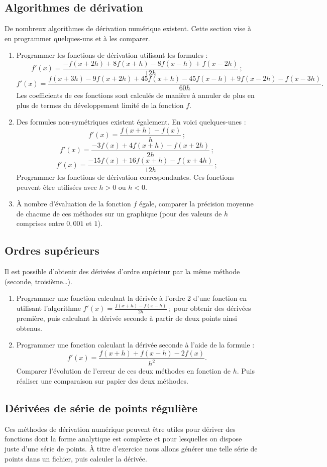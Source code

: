 \subsection{Algorithmes de dérivation}
De nombreux algorithmes de dérivation numérique existent. Cette section vise à
en programmer quelques-uns et à les comparer.
\begin{enumerate}
\item Programmer les fonctions de dérivation utilisant les formules : 
$$f'(x)= \frac{-f(x+2h)+8f(x+h)-8f(x-h)+f(x-2h)}{12h}\,;$$ 
$$f'(x)= \frac{f(x+3h)-9f(x+2h)+45f(x+h)-45f(x-h)+9f(x-2h)-f(x-3h)}{60h}.$$
Les coefficients de ces fonctions sont calculés de manière à annuler de plus en
plus de termes du développement limité de la fonction $f$.
\item Des formules non-symétriques existent également. En voici quelques-unes :
 $$f'(x) = \frac{f(x+h)-f(x)}{h}\,;$$
$$f'(x)=\frac{-3f(x)+4f(x+h) -f(x+2h)}{2h}\,;$$
$$f'(x)=\frac{-15f(x)+16f(x+h) -f(x+4h)}{12h}\,;$$
 Programmer les fonctions de dérivation correspondantes. Ces fonctions peuvent être utilisées avec $h>0$ ou $h<0$.
\item À nombre d'évaluation de la fonction $f$ égale, comparer la précision moyenne de
chacune de ces méthodes sur un graphique (pour des valeurs de $h$ comprises entre $0,001$ et $1$).
\end{enumerate}



\subsection{Ordres supérieurs}
Il est possible d'obtenir des dérivées d'ordre supérieur par la même méthode (seconde, troisième\ldots).
\begin{enumerate}
\item Programmer une fonction calculant la dérivée à l'ordre 2 d'une fonction en 
utilisant l'algorithme $f'(x)= \frac{f(x+h)-f(x-h)}{2h}\,;$ pour obtenir 
des dérivées première, puis calculant la dérivée seconde à partir de deux points ainsi obtenus. 
\item Programmer une fonction calculant la dérivée seconde à l'aide de la formule :
$$f'(x)= \frac{f(x+h)+f(x-h)-2f(x)}{h^2}.$$
Comparer l'évolution de l'erreur de ces deux méthodes en fonction de $h$. Puis réaliser
une comparaison \og{} sur papier \fg{} des deux méthodes. 
\end{enumerate}

\subsection{Dérivées de série de points régulière}
Ces méthodes de dérivation numérique peuvent être utiles pour dériver des fonctions 
dont la forme analytique est complexe et pour lesquelles on dispose juste 
d'une série de points. À titre d'exercice nous allons générer une telle série 
de points dans un fichier, puis calculer la dérivée.

